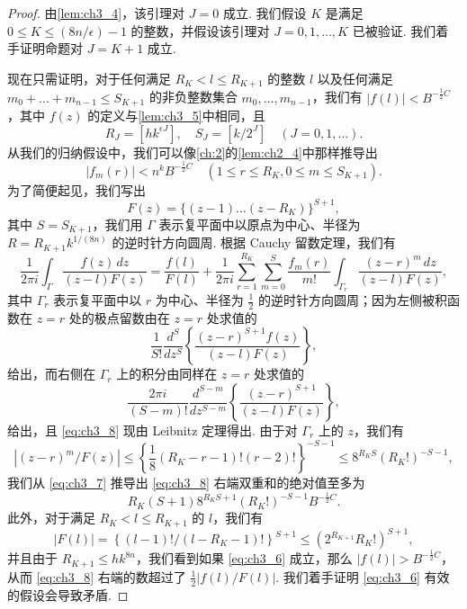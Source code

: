 \begin{proof}
由\autoref{lem:ch3_4}，该引理对 $J=0$ 成立. 我们假设 $K$ 是满足 $0 \le K \le (8n/\epsilon) - 1$ 的整数，并假设该引理对 $J=0,1,\dots,K$ 已被验证. 我们着手证明命题对 $J=K+1$ 成立.

现在只需证明，对于任何满足 $R_K < l \le R_{K+1}$ 的整数 $l$ 以及任何满足 $m_0 + \dots + m_{n-1} \le S_{K+1}$ 的非负整数集合 $m_0, \dots, m_{n-1}$，我们有 $|f(l)| < B^{-\frac{1}{2}C}$，其中 $f(z)$ 的定义与\autoref{lem:ch3_5}中相同，且
\[
R_J = \left[hk^{\epsilon J}\right], \quad S_J = \left[k/2^J\right] \quad (J = 0, 1, \dots).
\]
从我们的归纳假设中，我们可以像\autoref{ch:2}的\autoref{lem:ch2_4}中那样推导出
\begin{equation} \label{eq:ch3_7}\tag{7}
|f_m(r)| < n^k B^{-\frac{1}{2}C} \quad (1 \le r \le R_K, 0 \le m \le S_{K+1}).
\end{equation}
为了简便起见，我们写出
\[
F(z) = \{(z-1) \dots (z-R_K)\}^{S+1},
\]
其中 $S = S_{K+1}$，我们用 $\Gamma$ 表示复平面中以原点为中心、半径为 $R = R_{K+1} k^{1/(8n)}$ 的逆时针方向圆周. 根据 Cauchy 留数定理，我们有
\begin{equation} \label{eq:ch3_8}\tag{8}
\frac{1}{2\pi i} \int_{\Gamma} \frac{f(z) \, dz}{(z-l) F(z)} = \frac{f(l)}{F(l)} + \frac{1}{2\pi i} \sum_{r=1}^{R_K} \sum_{m=0}^{S} \frac{f_m(r)}{m!} \int_{\Gamma_r} \frac{(z-r)^m \, dz}{(z-l) F(z)},
\end{equation}
其中 $\Gamma_r$ 表示复平面中以 $r$ 为中心、半径为 $\frac{1}{2}$ 的逆时针方向圆周；因为左侧被积函数在 $z=r$ 处的极点留数由在 $z=r$ 处求值的
\[
\frac{1}{S!} \frac{d^S}{dz^S} \left\{ \frac{(z-r)^{S+1} f(z)}{(z-l) F(z)} \right\},
\]
给出，而右侧在 $\Gamma_r$ 上的积分由同样在 $z=r$ 处求值的
\[
\frac{2\pi i}{(S-m)!} \frac{d^{S-m}}{dz^{S-m}} \left\{ \frac{(z-r)^{S+1}}{(z-l)F(z)} \right\},
\]
给出，且 \eqref{eq:ch3_8} 现由 Leibnitz 定理得出. 由于对 $\Gamma_r$ 上的 $z$，我们有
\[
\left|(z-r)^m/F(z)\right| \le \left\{\frac{1}{8}(R_K-r-1)! (r-2)!\right\}^{-S-1} \le 8^{R_K S} (R_K!)^{-S-1},
\]
我们从 \eqref{eq:ch3_7} 推导出 \eqref{eq:ch3_8} 右端双重和的绝对值至多为
\[
R_K (S+1) 8^{R_K S+1} (R_K!)^{-S-1} B^{-\frac{1}{2}C}.
\]
此外，对于满足 $R_K < l \le R_{K+1}$ 的 $l$，我们有
\[
|F(l)| = \left\{ (l-1)! / (l-R_K-1)! \right\}^{S+1} \le (2^{R_{K+1}} R_K!)^{S+1},
\]
并且由于 $R_{K+1} \le hk^{8n}$，我们看到如果 \eqref{eq:ch3_6} 成立，那么 $|f(l)| > B^{-\frac{1}{2}C}$，从而 \eqref{eq:ch3_8} 右端的数超过了 $\frac{1}{2}|f(l)/F(l)|$. 我们着手证明 \eqref{eq:ch3_6} 有效的假设会导致矛盾.


\end{proof}
